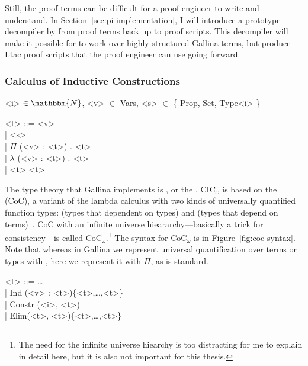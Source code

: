 Still, the proof terms can be difficult for a proof engineer to write and understand.
In Section~\ref{sec:pi-implementation}, I will introduce a prototype decompiler by  from proof terms back up to proof scripts.
This decompiler will make it possible for \sysnamelong to work over highly structured Gallina terms,
but produce Ltac proof scripts that the proof engineer can use going forward.

\subsubsection{Calculus of Inductive Constructions}
\label{sec:cic}

\begin{figure*}
\small
\begin{grammar}
<i> $\in \mathbbm{N}$, <v> $\in$ Vars, <s> $\in$ \{ Prop, Set, Type<i> \}

<t> ::= <v>\\
| <s> \\
| $\Pi$ (<v> : <t>) . <t>\\
| $\lambda$ (<v> : <t>) . <t>\\
|  <t> <t>
\end{grammar}
\caption{Syntax for CoC$_\omega$ with (from top to bottom) variables, sorts, function types, functions, and application.}
\label{fig:coc-syntax}
\end{figure*}

The type theory that Gallina implements is , or the .
CIC$_{\omega}$ is based on the  (CoC), a variant of the lambda calculus with two kinds of universally quantified function types:  (types that dependent on types) and  (types that depend on terms)~\cite{coquand:inria-00076024}.
CoC with an infinite universe hieararchy---basically a trick for consistency---is 
called CoC$_{\omega}$.\footnote{The need for the infinite universe hiearchy is too distracting for me to explain in detail here, but it is also not important for this thesis.}
The syntax for CoC$_{\omega}$ is in Figure~\ref{fig:coc-syntax}.
Note that whereas in Gallina we represent universal quantification over terms or types with \ltacforall, here we represent it with $\Pi$, as is standard.

\begin{figure*}
\small
\begin{grammar}
<t> ::= \ldots\\
| Ind (<v> : <t>)\{<t>,\ldots,<t>\} \\
| Constr (<i>, <t>)\\
| Elim(<t>, <t>)\{<t>,\ldots,<t>\}
\end{grammar}
\caption{CIC$_\omega$ is CoC$_\omega$ with , inductive , and .}
\label{fig:cic-syntax}
\end{figure*}

